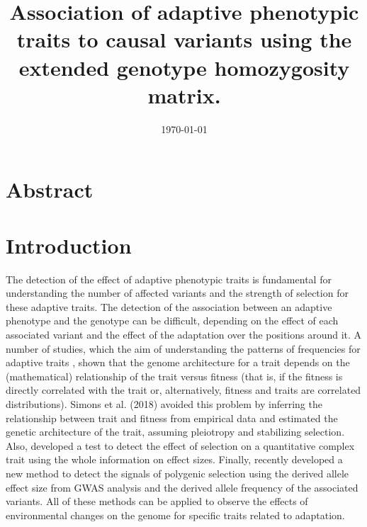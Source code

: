 \documentclass[a4paper,11pt]{article}
\begin{document}
\title{Association of adaptive phenotypic traits to causal variants using the extended genotype homozygosity matrix.}
\date{\today}
\maketitle

\section{Abstract}



\section{Introduction}

The detection of the effect of adaptive phenotypic traits is fundamental for understanding the number of affected variants and the strength of selection for these adaptive traits. The detection of the association between an adaptive phenotype and the genotype can be difficult, depending on the effect of each associated variant and the effect of the adaptation over the positions around it. A number of studies, which the aim of understanding the patterns of frequencies for adaptive traits  \citep[\textit{e.g.},][]{Eyre-Walker:2010aa,Caballero:2015aa,Lourenco:2011aa,Connallon:2015aa}, shown that the genome architecture for a trait depends on the (mathematical) relationship of the trait versus fitness (that is, if the fitness is directly correlated with the trait or, alternatively, fitness and traits are correlated distributions). Simons et al. (2018) avoided this problem by inferring the relationship between trait and fitness from empirical data and estimated the genetic architecture of the trait, assuming pleiotropy and stabilizing selection. Also, \citet{Beissinger:2018aa} developed a test to detect the effect of selection on a quantitative complex trait using the whole information on effect sizes. Finally, \citet{Uricchio:2019aa} recently developed a new method to detect the signals of polygenic selection using the derived allele effect size from GWAS analysis and the derived allele frequency of the associated variants. All of these methods can be applied to observe the effects of environmental changes on the genome for specific traits related to adaptation. 
\end{document}
